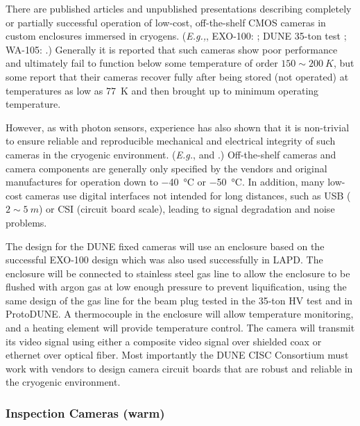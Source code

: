 There are published articles and unpublished presentations describing
completely or partially successful operation of low-cost,
off-the-shelf CMOS cameras in custom enclosures immersed in cryogens.
({\em E.g.,}, EXO-100: \cite{Delaquis:2013hva}; DUNE 35-ton test
\cite{McConkey:2016spe}; WA-105: \cite{Murphy:20170516}.)  Generally
it is reported that such cameras show poor performance and ultimately
fail to function below some temperature of order \(150\sim\SI{
  200}{K}\), but some report that their cameras recover fully after
being stored (not operated) at temperatures as low as \SI{77}{K} and
then brought up to minimum operating temperature.

However, as with photon sensors, experience has also shown that it is
non-trivial to ensure reliable and reproducible mechanical and
electrical integrity of such cameras in the cryogenic environment.
({\em E.g.}, \cite{McConkey:2016spe} and
\cite{Valencia-Rodriquez:20180130}.)  Off-the-shelf cameras and camera
components are generally only specified by the vendors and original
manufactures for operation down to \SI{-40}{\celsius} or \SI{-50}{\celsius}.
In addition, many low-cost cameras use digital interfaces not intended
for long distances, such as USB (\(2\sim\SI{5}{m}\)) or CSI (circuit
board scale), leading to signal degradation and noise problems.

The design for the DUNE fixed cameras will use an enclosure based on
the successful EXO-100 design\cite{Delaquis:2013hva} which was also
used successfully in LAPD. The enclosure will be connected to
stainless steel gas line to allow the enclosure to be flushed with
argon gas at low enough pressure to prevent liquification, using the
same design of the gas line for the beam plug tested in the 35-ton HV
test and in ProtoDUNE.  A thermocouple in the enclosure will allow
temperature monitoring, and a heating element will provide temperature
control.  The camera will transmit its video signal using either a
composite video signal over shielded coax or ethernet over optical
fiber.  Most importantly the DUNE CISC Consortium must work with
vendors to design camera circuit boards that are robust and reliable
in the cryogenic environment.



\subsubsection{Inspection Cameras (warm)}



